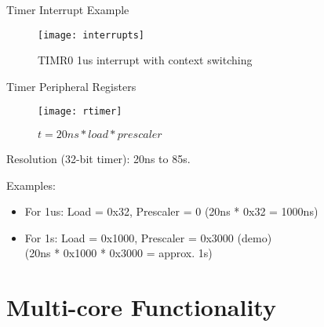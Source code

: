 \documentclass[aspectratio=169]{beamer}
\begin{document}
\begin{frame}{Timer Interrupt Example}
    \begin{figure}
        \centering
        \texttt{[image: interrupts]}
        \caption{TIMR0 1us interrupt with context switching}
        \label{fig:my_label}
    \end{figure}
\end{frame}

\begin{frame}{Timer Peripheral Registers}
    \begin{figure}
        \centering
        \texttt{[image: rtimer]}
        \caption{$t = 20{ns} * {load} * {prescaler}$}
        \label{}
    \end{figure}
    Resolution (32-bit timer): 20ns to 85s.
    
    Examples: 
    \begin{itemize}
        \item For 1us: Load = 0x32, Prescaler = 0 (20ns * 0x32 = 1000ns)
        \item For 1s:  Load = 0x1000, Prescaler = 0x3000 (demo)\\(20ns * 0x1000 * 0x3000 = approx. 1s)
    \end{itemize}
\end{frame}

\section{Multi-core Functionality}
\frame{\tableofcontents[currentsection, subsectionstyle=show/show/hide]}
\end{document}
